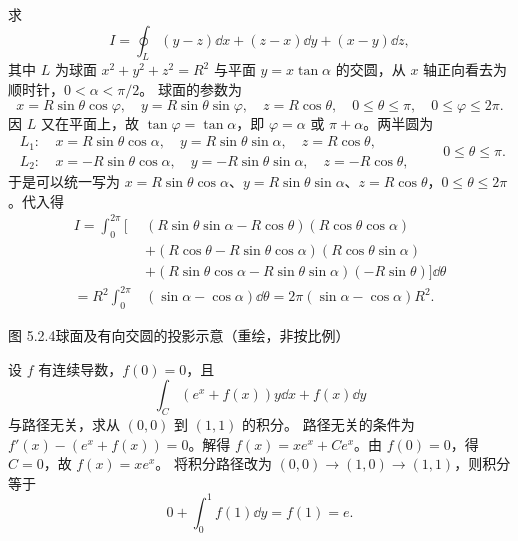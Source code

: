 求
\[
I=\oint_L(y-z)\dd x+(z-x)\dd y+(x-y)\dd z,
\]
其中 $L$ 为球面 $x^2+y^2+z^2=R^2$ 与平面 $y=x\tan\alpha$ 的交圆，从 $x$ 轴正向看去为顺时针，$0<\alpha<\pi/2$。
\sol 球面的参数为
\[
x=R\sin\theta\cos\varphi,\quad y=R\sin\theta\sin\varphi,\quad z=R\cos\theta,
\quad 0\le\theta\le\pi,\quad0\le\varphi\le2\pi.
\]
因 $L$ 又在平面上，故 $\tan\varphi=\tan\alpha$，即 $\varphi=\alpha$ 或 $\pi+\alpha$。两半圆为
\[
\begin{aligned}
L_1:\ &x=R\sin\theta\cos\alpha,\quad y=R\sin\theta\sin\alpha,\quad z=R\cos\theta,\\
L_2:\ &x=-R\sin\theta\cos\alpha,\quad y=-R\sin\theta\sin\alpha,\quad z=-R\cos\theta,
\end{aligned}\qquad 0\le\theta\le\pi.
\]
于是可以统一写为 $x=R\sin\theta\cos\alpha$、$y=R\sin\theta\sin\alpha$、$z=R\cos\theta$，$0\le\theta\le2\pi$。代入得
\begin{align*}
I=\int_0^{2\pi}\bigl[&(R\sin\theta\sin\alpha-R\cos\theta)(R\cos\theta\cos\alpha)\\
&+(R\cos\theta-R\sin\theta\cos\alpha)(R\cos\theta\sin\alpha)\\
&+(R\sin\theta\cos\alpha-R\sin\theta\sin\alpha)(-R\sin\theta)\bigr]\dd\theta\\
=R^2\int_0^{2\pi}&(\sin\alpha-\cos\alpha)\dd\theta=2\pi(\sin\alpha-\cos\alpha)R^2.
\end{align*}
\begin{center}\begin{minipage}{\linewidth}\centering
{}\par{\small 图 5.2.4\quad 球面及有向交圆的投影示意（重绘，非按比例）}
\end{minipage}\end{center}

设 $f$ 有连续导数，$f(0)=0$，且
\[
\int_C(e^x+f(x))y\dd x+f(x)\dd y
\]
与路径无关，求从 $(0,0)$ 到 $(1,1)$ 的积分。
\sol 路径无关的条件为 $f'(x)-(e^x+f(x))=0$。解得
$f(x)=xe^x+Ce^x$。由 $f(0)=0$，得 $C=0$，故 $f(x)=xe^x$。
将积分路径改为 $(0,0)\to(1,0)\to(1,1)$，则积分等于
\[
0+\int_0^1 f(1)\dd y=f(1)=e.
\]

